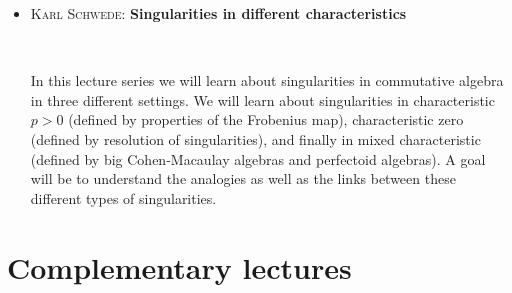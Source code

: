\documentclass[12pt]{amsart}
\begin{document}
\begin{itemize}
\vfill


\item  \textsc{Karl Schwede:} \textbf{Singularities in different characteristics}

\

\noindent In this lecture series we will learn about singularities in
commutative algebra in three different settings.  We will learn about
singularities in characteristic $p > 0$ (defined by properties of the
Frobenius map), characteristic zero (defined by resolution of
singularities), and finally
in mixed characteristic (defined by big Cohen-Macaulay algebras and
perfectoid algebras).  A goal will be to understand the analogies as well
as the links between these different types of singularities.

\vfill

\end{itemize}

\vfill

\newpage

\section*{Complementary lectures}
\end{document}
